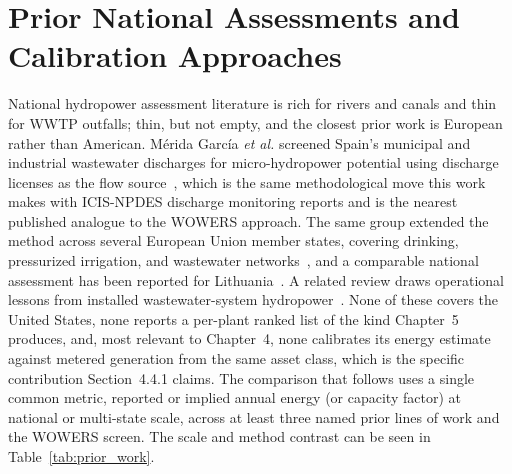 \documentclass[12pt,letterpaper]{report}
\begin{document}
\section{Prior National Assessments and Calibration Approaches}

National hydropower assessment literature is rich for rivers and canals and thin for
WWTP outfalls; thin, but not empty, and the closest prior work is European rather than
American. M\'erida Garc\'ia \emph{et al.} screened Spain's municipal and industrial
wastewater discharges for micro-hydropower potential using discharge licenses as the flow
source~\cite{merida2021}, which is the same methodological move this work makes with
ICIS-NPDES discharge monitoring reports and is the nearest published analogue to the WOWERS
approach. The same group extended the method across several European Union member states,
covering drinking, pressurized irrigation, and wastewater networks~\cite{mcnabola2021}, and
a comparable national assessment has been reported for Lithuania~\cite{punys2022}. A related
review draws operational lessons from installed wastewater-system
hydropower~\cite{novara2021}. None of these covers the United States, none reports a
per-plant ranked list of the kind Chapter~5 produces, and, most relevant to Chapter~4,
none calibrates its energy estimate against metered generation from the same asset class,
which is the specific contribution Section~4.4.1 claims. The comparison that follows uses a
single common metric, reported or implied annual energy (or capacity factor) at national or
multi-state scale, across at least three named prior lines of work and the WOWERS screen. The scale and method contrast
can be seen in Table~\ref{tab:prior_work}.
\end{document}
